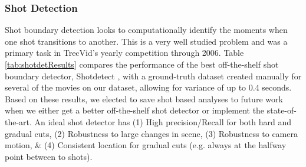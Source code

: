\subsubsection*{Shot Detection}
Shot boundary detection looks to computationally identify the moments when one shot transitions to another. This is a very well studied problem \cite{boreczky1996comparison} \cite{lienhart1998comparison} \cite{lu2013fast} \cite{chavan2014review} and was a primary task in TrecVid's yearly competition \cite{smeaton_video_2010} through 2006. Table \ref{tab:shotdetResults} compares the performance of the best off-the-shelf shot boundary detector, Shotdetect \cite{mathe_shotdetect_2015}, with a ground-truth dataset created manually for several of the movies on our dataset, allowing for variance of up to 0.4 seconds. Based on these results, we elected to save shot based analyses to future work when we either get a better off-the-shelf shot detector or implement the state-of-the-art. An ideal shot detector has (1) High precision/Recall for both hard and gradual cuts, (2) Robustness to large changes in scene, (3) Robustness to camera motion, \& (4) Consistent location for gradual cuts (e.g. always at the halfway point between to shots).
